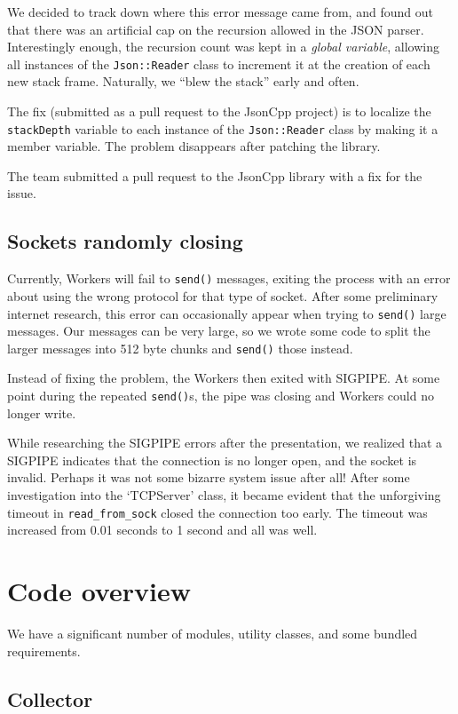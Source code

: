 \documentclass[letterpaper,twocolumn,10pt]{article}
\begin{document}
We decided to track down where this error message came from, and found out that
there was an artificial cap on the recursion allowed in the JSON parser.
Interestingly enough, the recursion count was kept in a \textit{global
  variable}, allowing all instances of the \verb|Json::Reader| class to
increment it at the creation of each new stack frame. Naturally, we ``blew the
stack'' early and often.

The fix (submitted as a pull request to the JsonCpp project) is to localize the
\verb|stackDepth| variable to each instance of the \verb|Json::Reader| class by
making it a member variable. The problem disappears after patching the library.

The team submitted a pull request to the JsonCpp library with a fix for the
issue.

\subsection{Sockets randomly closing}

Currently, Workers will fail to \verb|send()| messages, exiting the process with
an error about using the wrong protocol for that type of socket. After some
preliminary internet research, this error can occasionally appear when trying to
\verb|send()| large messages. Our messages can be very large, so we wrote some
code to split the larger messages into 512 byte chunks and \verb|send()| those
instead.

Instead of fixing the problem, the Workers then exited with SIGPIPE. At some
point during the repeated \verb|send()|s, the pipe was closing and Workers could
no longer write.

While researching the SIGPIPE errors after the presentation, we realized that a
SIGPIPE indicates that the connection is no longer open, and the socket is
invalid. Perhaps it was not some bizarre system issue after all! After some
investigation into the `TCPServer' class, it became evident that the unforgiving
timeout in \verb|read_from_sock| closed the connection too early. The timeout
was increased from 0.01 seconds to 1 second and all was well.

\section{Code overview}

We have a significant number of modules, utility classes, and some bundled
requirements.

\subsection{Collector}
\end{document}
